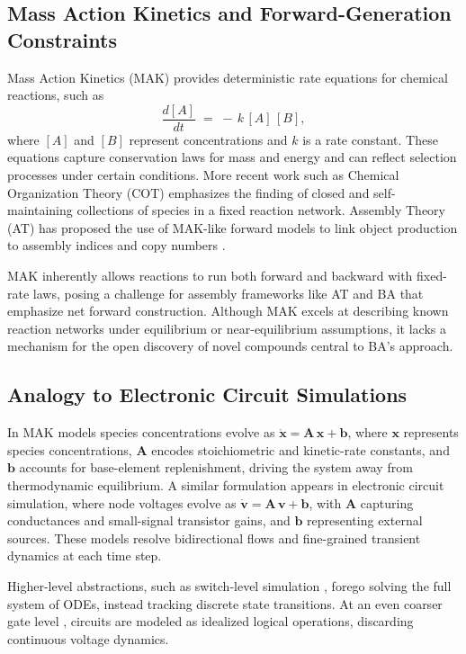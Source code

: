 \documentclass[entropy,article,submit,pdftex,moreauthors]{Definitions/mdpi}
\begin{document}
\subsection{Mass Action Kinetics and Forward-Generation Constraints}
\label{subsec:mak-forward-limitations}

Mass Action Kinetics (MAK) \cite{TuranyiTomlin2014} provides deterministic rate equations for chemical reactions, such as
\[
\frac{d[A]}{dt} \;=\; -\,k\, [A]\,[B],
\]
where $[A]$ and $[B]$ represent concentrations and $k$ is a rate constant. These equations capture conservation laws for mass and energy and can reflect selection processes under certain conditions. More recent work such as Chemical Organization Theory (COT) \cite{DittrichFenizio2005} emphasizes the finding of closed and self-maintaining collections of species in a fixed reaction network. Assembly Theory (AT) has proposed the use of MAK-like forward models to link object production to assembly indices and copy numbers \cite{walker2023nature}.

MAK inherently allows reactions to run both forward and backward with fixed-rate laws, posing a challenge for assembly frameworks like AT and BA that emphasize net forward construction. Although MAK excels at describing known reaction networks under equilibrium or near-equilibrium assumptions, it lacks a mechanism for the open discovery of novel compounds central to BA’s approach.

\subsection{Analogy to Electronic Circuit Simulations}
\label{subsec:spice-analogy}

In MAK models species concentrations evolve as 
$\dot{\mathbf{x}} = \mathbf{A}\,\mathbf{x} + \mathbf{b}$, where \(\mathbf{x}\) represents species concentrations, \(\mathbf{A}\) encodes stoichiometric and kinetic-rate constants, and \(\mathbf{b}\) accounts for base-element replenishment, driving the system away from thermodynamic equilibrium. A similar formulation appears in electronic circuit simulation, where node voltages evolve as 
$\dot{\mathbf{v}} = \mathbf{A}\,\mathbf{v} + \mathbf{b}$, with \(\mathbf{A}\) capturing conductances and small-signal transistor gains, and \(\mathbf{b}\) representing external sources. These models resolve bidirectional flows and fine-grained transient dynamics at each time step.

Higher-level abstractions, such as switch-level simulation \cite{AdlerCAD}, forego solving the full system of ODEs, instead tracking discrete state transitions. At an even coarser gate level \cite{FeynmanComp}, circuits are modeled as idealized logical operations, discarding continuous voltage dynamics.
\end{document}
